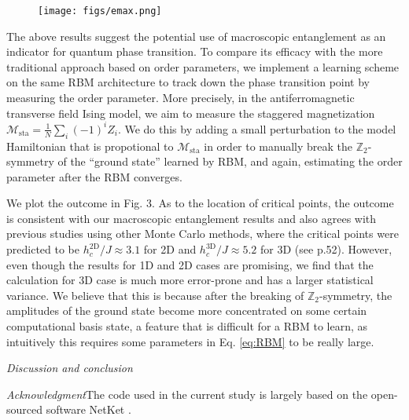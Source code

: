 \documentclass[aps,prl,reprint,superscriptaddress]{revtex4-2}
\begin{document}
\begin{figure}
	\hspace*{-0.48\textwidth}
	\texttt{[image: figs/emax.png]}%
	\caption{}
	\label{fig:emax}
\end{figure}

The above results suggest the potential use of macroscopic entanglement as an indicator for quantum phase transition. To compare its efficacy with the more traditional approach based on order parameters, we implement a learning scheme on the same RBM architecture to track down the phase transition point by measuring the order parameter. More precisely, in the antiferromagnetic transverse field Ising model, we aim to measure the staggered magnetization $ \mathcal{M}_{\text{sta}} = \frac{1}{N} \sum_{i}(-1)^{i} Z_{i} $. We do this by adding a small perturbation to the model Hamiltonian that is propotional to $ \mathcal{M}_{\text{sta}} $ in order to manually break the $ \mathbb{Z}_2 $-symmetry of the ``ground state'' learned by RBM, and again, estimating the order parameter after the RBM converges.

We plot the outcome in Fig. 3. As to the location of critical points, the outcome is consistent with our macroscopic entanglement results and also agrees with previous studies using other Monte Carlo methods, where the critical points were predicted to be $ h_c^{\text{2D}}/J \approx 3.1 $ for 2D and $ h_c^{\text{3D}}/J \approx 5.2 $ for 3D (see \cite{Suzuki2012Quantum-Ising} p.52). However, even though the results for 1D and 2D cases are promising, we find that the calculation for 3D case is much more error-prone and has a larger statistical variance. We believe that this is because after the breaking of $ \mathbb{Z}_2 $-symmetry, the amplitudes of the ground state become more concentrated on some certain computational basis state, a feature that is difficult for a RBM to learn, as intuitively this requires some parameters in Eq. \eqref{eq:RBM} to be really large.




\emph{Discussion and conclusion}\textemdash 

\emph{Acknowledgment}\textemdash The code used in the current study is largely based on the open-sourced software NetKet \cite{Carleo2019netket}.

\end{document}
